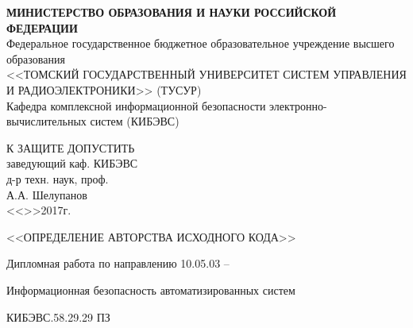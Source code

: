 \newpage
{}

\begin{center}
 \textbf{МИНИСТЕРСТВО ОБРАЗОВАНИЯ И НАУКИ РОССИЙСКОЙ ФЕДЕРАЦИИ}\\
 Федеральное государственное бюджетное образовательное учреждение высшего образования\\
 <<ТОМСКИЙ ГОСУДАРСТВЕННЫЙ УНИВЕРСИТЕТ СИСТЕМ УПРАВЛЕНИЯ И РАДИОЭЛЕКТРОНИКИ>> (ТУСУР)\\
 Кафедра комплексной информационной безопасности электронно-вычислительных систем (КИБЭВС)\\
\end{center} 

\vfill

\begin{flushright}
\begin{minipage}{0.45\textwidth}
 \begin{flushleft}
  К ЗАЩИТЕ ДОПУСТИТЬ\\
  заведующий каф. КИБЭВС\\
  д-р техн. наук, проф.\\
  \underline{\hspace{3cm}}А.А. Шелупанов \\
  <<\underline{\hspace{1cm}}>>\underline{\hspace{3cm}}2017г.\\
 \end{flushleft}
\end{minipage}
\end{flushright}

\vfill



\begin{center}
<<ОПРЕДЕЛЕНИЕ АВТОРСТВА ИСХОДНОГО КОДА>>

Дипломная работа по направлению 10.05.03 --

Информационная безопасность автоматизированных систем

КИБЭВС.58.29.29 ПЗ
\end{center}


\vfill


